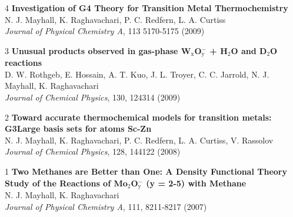 \documentclass[10pt]{article}
\newenvironment{lonelist}[1][\enskip\textbullet]%
        {\vspace{-\baselineskip}\begin{list}{#1}{%
        \setlength{\partopsep}{0pt}%
        \setlength{\topsep}{0pt}}}
        {\end{list}\vspace{-.6\baselineskip}}
\newcommand{\blankline}{\quad\pagebreak[2]}
\begin{document}
\begin{lonelist}
\item[4\hspace{4pt}] \textbf{Investigation of G4 Theory for Transition Metal Thermochemistry}\\
N. J. Mayhall, K. Raghavachari, P. C. Redfern, L. A. Curtiss\\
\textsl{Journal of Physical Chemistry A}, 113 5170-5175 (2009)


\item[3\hspace{4pt}] \textbf{Unusual products observed in gas-phase W$_\text{x}$O$_\text{y}^-$ + H$_2$O and D$_2$O reactions}\\
D. W. Rothgeb, E. Hossain, A. T. Kuo, J. L. Troyer, C. C. Jarrold, N. J. Mayhall, K. Raghavachari\\
\textsl{Journal of Chemical Physics}, 130, 124314 (2009)


\item[2\hspace{4pt}] \textbf{Toward accurate
thermochemical models for transition metals: G3Large basis sets for atoms Sc-Zn}\\
N. J. Mayhall, K. Raghavachari, P. C. Redfern, L. A. Curtiss, V. Rassolov\\
\textsl{Journal of Chemical Physics}, 128, 144122 (2008)


\item[1\hspace{4pt}] \textbf{Two Methanes are Better than One: A Density Functional Theory Study of the Reactions of Mo$_{2}$O$_\text{y}^-$ (y = 2-5) with Methane}\\
N. J. Mayhall, K. Raghavachari\\
\textsl{Journal of Physical Chemistry A}, 111, 8211-8217 (2007)
\end{lonelist}

\blankline
\end{document}
